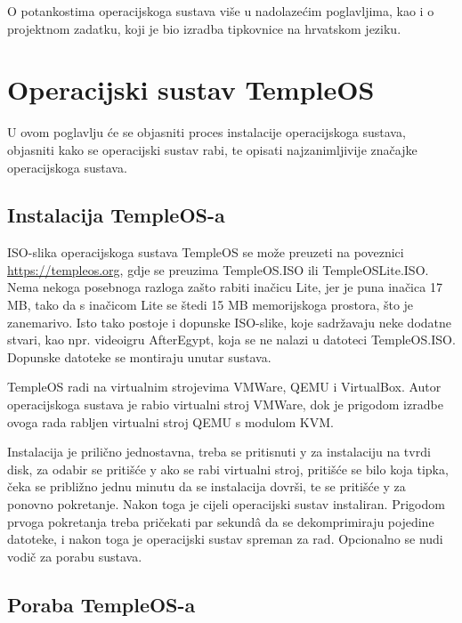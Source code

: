 \documentclass{foi}
\begin{document}
O potankostima operacijskoga sustava više u nadolazećim poglavljima, kao i o projektnom zadatku, koji je bio izradba tipkovnice na hrvatskom jeziku.

\chapter{Operacijski sustav TempleOS}

U ovom poglavlju će se objasniti proces instalacije operacijskoga sustava, objasniti kako se operacijski sustav rabi, te opisati najzanimljivije značajke operacijskoga sustava.

\section{Instalacija TempleOS-a\label{instalacijaTOSa}}

ISO-slika operacijskoga sustava TempleOS se može preuzeti na poveznici \url{https://templeos.org}, gdje se preuzima {\selectfont TempleOS.ISO} ili {\selectfont TempleOSLite.ISO}. Nema nekoga posebnoga razloga zašto rabiti inačicu Lite, jer je puna inačica 17 MB, tako da s inačicom Lite se štedi 15 MB memorijskoga prostora, što je zanemarivo. Isto tako postoje i dopunske ISO-slike, koje sadržavaju neke dodatne stvari, kao npr. videoigru AfterEgypt, koja se ne nalazi u datoteci {\selectfont TempleOS.ISO}. Dopunske datoteke se montiraju unutar sustava.

TempleOS radi na virtualnim strojevima VMWare, QEMU i VirtualBox. Autor operacijskoga sustava je rabio virtualni stroj VMWare, dok je prigodom izradbe ovoga rada rabljen virtualni stroj QEMU s modulom KVM.

Instalacija je prilično jednostavna, treba se pritisnuti {\selectfont y} za instalaciju na tvrdi disk, za odabir se pritišće {\selectfont y} ako se rabi virtualni stroj, pritišće se bilo koja tipka, čeka se približno jednu minutu da se instalacija dovrši, te se pritišće {\selectfont y} za ponovno pokretanje. Nakon toga je cijeli operacijski sustav instaliran. Prigodom prvoga pokretanja treba pričekati par sekundâ da se dekomprimiraju pojedine datoteke, i nakon toga je operacijski sustav spreman za rad. Opcionalno se nudi vodič za porabu sustava.

\section{Poraba TempleOS-a}
\end{document}
